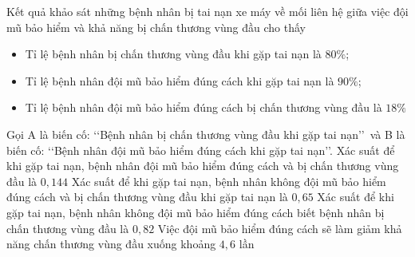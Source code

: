 \begin{ex}%

	Kết quả khảo sát những bệnh nhân bị tai nạn xe máy về mối liên hệ giữa việc đội mũ bảo hiểm và khả năng bị chấn thương vùng đầu cho thấy
	\begin{itemize}
		\item Tỉ lệ bệnh nhân bị chấn thương vùng đầu khi gặp tai nạn là $80 \%$;
		\item Tỉ lệ bệnh nhân đội mũ bảo hiểm đúng cách khi gặp tai nạn là $90 \%$;
		\item Tỉ lệ bệnh nhân đội mũ bảo hiểm đúng cách bị chấn thương vùng đầu là $18 \%$
	\end{itemize}
	Gọi A là biến cố: \lq\lq Bệnh nhân bị chấn thương vùng đầu khi gặp tai nạn\rq\rq\, và B là biến cố: \lq\lq Bệnh nhân đội mũ bảo hiểm đúng cách khi gặp tai nạn\rq\rq.
	\choiceTF
	{\True Xác suất để khi gặp tai nạn, bệnh nhân đội mũ bảo hiểm đúng cách và bị chấn thương vùng đầu là $0{,}144$}
	{Xác suất để khi gặp tai nạn, bệnh nhân không đội mũ bảo hiểm đúng cách và bị chấn thương vùng đầu khi gặp tai nạn là $0{,}65$}
	{\True Xác suất để khi gặp tai nạn, bệnh nhân không đội mũ bảo hiểm đúng cách biết bệnh nhân bị chấn thương vùng đầu là $0{,}82$}
	{\True Việc đội mũ bảo hiểm đúng cách sẽ làm giảm khả năng chấn thương vùng đầu xuống khoảng $4{,}6$ lần}
\end{ex}

